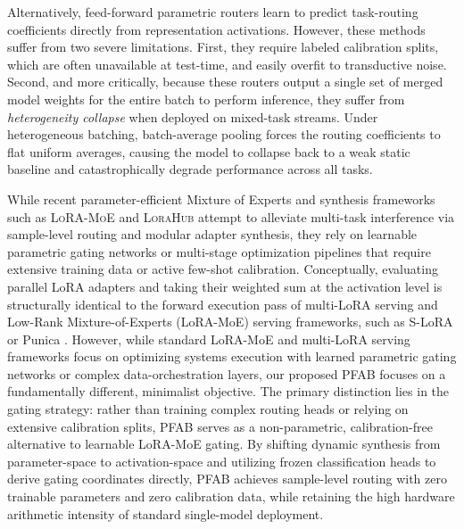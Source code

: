 Alternatively, feed-forward parametric routers learn to predict task-routing coefficients directly from representation activations. However, these methods suffer from two severe limitations. First, they require labeled calibration splits, which are often unavailable at test-time, and easily overfit to transductive noise. Second, and more critically, because these routers output a single set of merged model weights for the entire batch to perform inference, they suffer from \emph{heterogeneity collapse} when deployed on mixed-task streams. Under heterogeneous batching, batch-average pooling forces the routing coefficients to flat uniform averages, causing the model to collapse back to a weak static baseline and catastrophically degrade performance across all tasks. 

While recent parameter-efficient Mixture of Experts and synthesis frameworks such as \textsc{LoRA-MoE} \cite{loramoe2023} and \textsc{LoraHub} \cite{lorahub2023} attempt to alleviate multi-task interference via sample-level routing and modular adapter synthesis, they rely on learnable parametric gating networks or multi-stage optimization pipelines that require extensive training data or active few-shot calibration. Conceptually, evaluating parallel LoRA adapters and taking their weighted sum at the activation level is structurally identical to the forward execution pass of multi-LoRA serving and Low-Rank Mixture-of-Experts (LoRA-MoE) serving frameworks, such as S-LoRA \cite{s_lora2024} or Punica \cite{punica2023}. However, while standard LoRA-MoE and multi-LoRA serving frameworks focus on optimizing systems execution with learned parametric gating networks or complex data-orchestration layers, our proposed \textsc{PFAB} focuses on a fundamentally different, minimalist objective. The primary distinction lies in the gating strategy: rather than training complex routing heads or relying on extensive calibration splits, \textsc{PFAB} serves as a non-parametric, calibration-free alternative to learnable LoRA-MoE gating. By shifting dynamic synthesis from parameter-space to activation-space and utilizing frozen classification heads to derive gating coordinates directly, \textsc{PFAB} achieves sample-level routing with zero trainable parameters and zero calibration data, while retaining the high hardware arithmetic intensity of standard single-model deployment.

